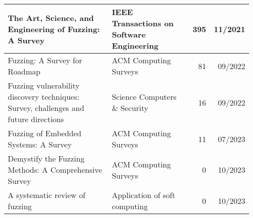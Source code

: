 \documentclass{article}
\begin{document}
\begin{longtable}{|P{0.44\textwidth}|P{0.32\textwidth}|r|r|}
    The Art, Science, and Engineering of Fuzzing: A Survey\cite{ArtScienceEngineeringFuzzing}                                                     & IEEE Transactions on Software Engineering                  & 395            & 11/2021       \\\hline
    Fuzzing: A Survey for Roadmap\cite{FuzzingASurveyforRoadmap}                                                                                  & ACM Computing Surveys                                      & 81             & 09/2022       \\\hline
    Fuzzing vulnerability discovery techniques: Survey, challenges and future directions\cite{FuzzingVulnerabilityDiscoveryTechniques}            & Science Computers \& Security                              & 16             & 09/2022       \\\hline
    Fuzzing of Embedded Systems: A Survey\cite{Embedded}                                                                                          & ACM Computing Surveys                                      & 11             & 07/2023       \\\hline
    Demystify the Fuzzing Methods: A Comprehensive Survey\cite{Demystifying}                                                                      & ACM Computing Surveys                                      & 0              & 10/2023       \\\hline
    A systematic review of fuzzing\cite{SystematicReview2023}                                                                                     & Application of soft computing                              & 0              & 10/2023       \\\hline
\end{longtable}


\pagebreak
\end{document}
